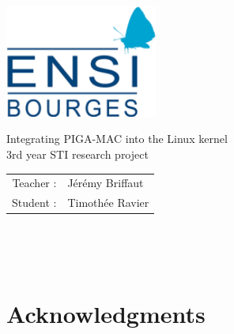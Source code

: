 \documentclass[pdftex,a4paper,titlepage,11pt]{article}
\newcommand\BackgroundPic[1]{
	\put(0,-100){
		\parbox[b][\paperheight]{\paperwidth}{
			\vfill
			\centering
			\texttt{[image: \#1]}
			\vfill
		}
	}
}
\begin{document}
\begin{titlepage}

\AddToShipoutPicture*{\BackgroundPic{Tux_n&b_half.png}}

\begin{center}
	\includegraphics[width=5cm, keepaspectratio=true]{Logo_ENSIB.png}
\end{center}

\vspace{0.5cm}

\begin{center}
	\fontsize{30}{30}\selectfont Integrating PIGA-MAC into the Linux kernel\\
	\vspace{2cm}
	\huge 3rd year STI research project\\[20pt] %
\end{center}

\vspace{4.5cm}

\begin{center}
	\begin{tabular}{rl}
		\hspace{7cm}
		\Large Teacher : & \Large Jérémy Briffaut\\[4pt]
		\Large Student : & \Large Timothée Ravier
	\end{tabular}
\end{center}

\end{titlepage}

\newpage

~\thispagestyle{fancy}

\newpage

~

\vspace{1cm}
\addtocounter{page}{-1}

\section*{Acknowledgments}
\end{document}
